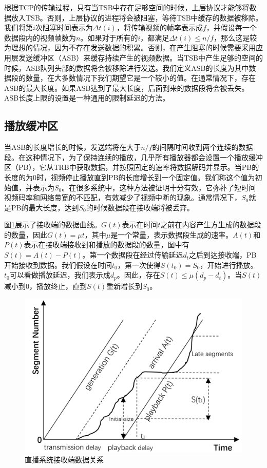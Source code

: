 根据TCP的传输过程，只有当TSB中存在足够空间的时候，上层协议才能够将数据放入TSB。否则，上层协议的进程将会被阻塞，等待TSB中缓存的数据被移除。我们将第$i$次阻塞时间表示为$\varDelta t(i)$，将传输视频的帧率表示成$f$，并假设每一个数据段内的视频帧数为$n$。如果对于所有的$i$，都满足$\varDelta t(i) \le n/f$，那么这是较为理想的情况，因为不存在发送数据的积累。否则，在产生阻塞的时候需要采用应用层发送缓冲区（ASB）来缓存持续产生的视频数据。当TSB中产生足够的空间的时候，ASB队列头部的数据将会被移除进行发送。我们定义ASB的长度为其中数据段的数量，在大多数情况下我们期望它是一个较小的值。在通常情况下，存在ASB的最大长度。如果ASB达到了最大长度，后面到来的数据段将会被丢失。ASB长度上限的设置是一种通用的限制延迟的方法。

\subsection{播放缓冲区}

当ASB的长度增长的时候，发送端将在大于$n/f$的间隔时间收到两个连续的数据段。在这种情况下，为了保持连续的播放，几乎所有播放器都会设置一个播放缓冲区（PB），它从TRB中获取数据，并按照固定的速率将数据解码并显示。当PB的长度的为0时，视频停止播放直到PB的长度增长到一个固定值。我们称这个值为初始值，并表示为$S_0$。在很多系统中，这种方法被证明十分有效，它弥补了短时间视频码率和网络带宽的不匹配，有效减少了视频中断的现象。通常情况下，$S_0$就是PB的最大长度，达到$S_0$的时候数据段在接收端将被丢弃。

图\ref{fig:20}展示了接收端的数据曲线。$G(t)$表示在时间$t$之前在内容产生方生成的数据段的数量，因此$G(t) = \mu t$，其中$\mu$是一个常量，表示数据段生成的速率。$A(t)$和$P(t)$表示在接收端接收到和播放的数据段的数量，图中有$S(t) = A(t) - P(t)$。第一个数据段在经过传输延迟$d_t$之后到达接收端，PB开始接收到数据。我们假设在时间$t_0$，第一次使得$S(t_0)=S_0$，开始进行播放。$t_0$可以看做播放延迟，我们表示成$d_p$。因此，存在$S(t) \le \mu (d_p - d_t)$。当$S(t)$减小到$0$，播放终止，直到$S(t)$重新增长到$S_0$。

\begin{figure}[t]
	\centering
	\includegraphics[width = 0.9\linewidth]{clip/20.png}
	\caption{直播系统接收端数据关系\label{fig:20}}
\end{figure}

